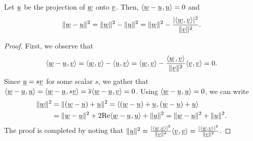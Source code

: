 \begin{lemma} \label{lem:proj_loss}
Let $\underline{u}$ be the projection of $\underline{w}$ onto $\underline{v}$.
Then, ${\langle  \underline{w}-\underline{u}  \mskip1mu ,  \underline{u}  \rangle} = 0$ and
\[ \|\underline{w}-\underline{u}\|^2 =  \|\underline{w}\|^2 - \| \underline{u} \|^2 = \|\underline{w}\|^2 - \frac{|{\langle  \underline{w}  \mskip1mu ,  \underline{v}  \rangle}|^2}{\|\underline{v}\|^2}. \]
\end{lemma}
\begin{proof}
First, we observe that
\[ {\langle  \underline{w} - \underline{u}  \mskip1mu ,  \underline{v}  \rangle} = {\langle  \underline{w}  \mskip1mu ,  \underline{v}  \rangle} - {\langle  \underline{u}  \mskip1mu ,  \underline{v}  \rangle} = {\langle  \underline{w}  \mskip1mu ,  \underline{v}  \rangle} - \frac{{\left\langle  \underline{w}  \mskip2mu ,  \underline{v}  \right\rangle}}{\|\underline{v}\|^2} {\langle  \underline{v}  \mskip1mu ,  \underline{v}  \rangle} = 0. \]
Since $\underline{u} = s \underline{v}$ for some scalar $s$, we gather that ${\langle  \underline{w}-\underline{u}  \mskip1mu ,  \underline{u}  \rangle} = {\langle  \underline{w}-\underline{u}  \mskip1mu ,  s \underline{v}  \rangle} = \overline{s} {\langle  \underline{w}-\underline{u}  \mskip1mu ,  \underline{v}  \rangle} = 0$.
Using ${\langle  \underline{w}-\underline{u}  \mskip1mu ,  \underline{u}  \rangle} = 0$, we can write
\begin{align*}
\|\underline{w}\|^2 &= \|(\underline{w}-\underline{u})+\underline{u}\|^2
= {\langle  (\underline{w}-\underline{u})+\underline{u} \mskip1mu , (\underline{w}-\underline{u})+\underline{u} \rangle} \\
&= \|\underline{w}-\underline{u}\|^2 + 2 \mathrm{Re} {\langle  \underline{w}-\underline{u}  \mskip1mu ,  \underline{u}  \rangle} + \|\underline{u}\|^2
= \|\underline{w}-\underline{u}\|^2 + \|\underline{u}\|^2.
\end{align*}
The proof is completed by noting that
$\|\underline{u}\|^2
= \frac{|{\langle  \underline{w}  \mskip1mu ,  \underline{v}  \rangle}|^2}{\|\underline{v}\|^4}
{\langle  \underline{v}  \mskip1mu ,  \underline{v}  \rangle}
= \frac{|{\langle  \underline{w}  \mskip1mu ,  \underline{v}  \rangle}|^2}{\|\underline{v}\|^2}$.
\end{proof}

